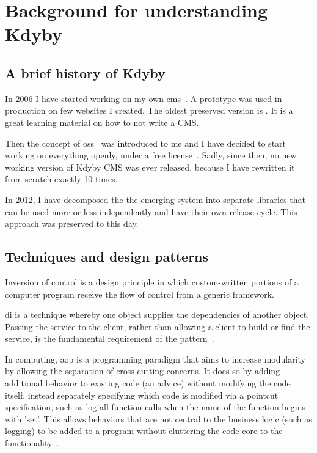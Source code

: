 \chapter{Background for understanding Kdyby}

\section{A brief history of Kdyby} \label{sec:theory:kdyby-history}

In 2006 I have started working on my own \gls{cms}~\cite{wiki:cms}. A prototype was used in production on few websites I created. The oldest preserved version is . It is a great learning material on how to not write a CMS.

Then the concept of \gls{oss}~\cite{wiki:oss} was introduced to me and I have decided to start working on everything openly, under a free license~\cite{wiki:fsl}. Sadly, since then, no new working version of Kdyby CMS was ever released, because I have rewritten it from scratch exactly 10 times.

In 2012, I have decomposed the the emerging system into separate libraries that can be used more or less independently and have their own release cycle. This approach was preserved to this day.

\section{Techniques and design patterns}

 \label{sec:theory:di}

Inversion of control is a design principle in which custom-written portions of a computer program receive the flow of control from a generic framework.

\Gls{di} is a technique whereby one object supplies the dependencies of another object. Passing the service to the client, rather than allowing a client to build or find the service, is the fundamental requirement of the pattern~\cite{fowler:di}.

 \label{sec:theory:aop}

In computing, \gls{aop} is a programming paradigm that aims to increase modularity by allowing the separation of cross-cutting concerns. It does so by adding additional behavior to existing code (an advice) without modifying the code itself, instead separately specifying which code is modified via a pointcut specification, such as log all function calls when the name of the function begins with 'set'. This allows behaviors that are not central to the business logic (such as logging) to be added to a program without cluttering the code core to the functionality~\cite{wiki:aop}.

